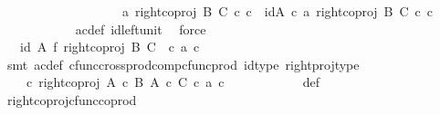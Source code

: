 \begin{isabellebody}
\ \ \ \ \ \ \isamarkupfalse%
\ {\isacharminus}{\kern0pt}\ \isanewline
\ \ \ \ \ \ \ \ \isamarkupfalse%
\ {\isachardoublequoteopen}{\isasymlangle}a{\isacharcomma}{\kern0pt}\ right{\isacharunderscore}{\kern0pt}coproj\ B\ C\ {\isasymcirc}\isactrlsub c\ c{\isasymrangle}\ {\isacharequal}{\kern0pt}\ {\isasymlangle}id{\isacharparenleft}{\kern0pt}A{\isacharparenright}{\kern0pt}\ {\isasymcirc}\isactrlsub c\ a{\isacharcomma}{\kern0pt}\ right{\isacharunderscore}{\kern0pt}coproj\ B\ C\ {\isasymcirc}\isactrlsub c\ c{\isasymrangle}{\isachardoublequoteclose}\isanewline
\ \ \ \ \ \ \ \ \ \ \isamarkupfalse%
\ ac{\isacharunderscore}{\kern0pt}def\ id{\isacharunderscore}{\kern0pt}left{\isacharunderscore}{\kern0pt}unit{}\ \isamarkupfalse%
\ force\isanewline
\ \ \ \ \ \ \ \ \isamarkupfalse%
\ \isamarkupfalse%
\ {\isachardoublequoteopen}{\isachardot}{\kern0pt}{\isachardot}{\kern0pt}{\isachardot}{\kern0pt}\ {\isacharequal}{\kern0pt}\ {\isacharparenleft}{\kern0pt}id\ A\ {\isasymtimes}\isactrlsub f\ right{\isacharunderscore}{\kern0pt}coproj\ B\ C{\isacharparenright}{\kern0pt}\ \ {\isasymcirc}\isactrlsub c\ {\isasymlangle}a{\isacharcomma}{\kern0pt}\ c{\isasymrangle}{\isachardoublequoteclose}\isanewline
\ \ \ \ \ \ \ \ \ \ \isamarkupfalse%
\ {\isacharparenleft}{\kern0pt}smt\ ac{\isacharunderscore}{\kern0pt}def\ cfunc{\isacharunderscore}{\kern0pt}cross{\isacharunderscore}{\kern0pt}prod{\isacharunderscore}{\kern0pt}comp{\isacharunderscore}{\kern0pt}cfunc{\isacharunderscore}{\kern0pt}prod\ id{\isacharunderscore}{\kern0pt}type\ right{\isacharunderscore}{\kern0pt}proj{\isacharunderscore}{\kern0pt}type{\isacharparenright}{\kern0pt}\isanewline
\ \ \ \ \ \ \ \ \isamarkupfalse%
\ \isamarkupfalse%
\ {\isachardoublequoteopen}{\isachardot}{\kern0pt}{\isachardot}{\kern0pt}{\isachardot}{\kern0pt}\ {\isacharequal}{\kern0pt}\ {\isacharparenleft}{\kern0pt}{\isasymphi}\ {\isasymcirc}\isactrlsub c\ right{\isacharunderscore}{\kern0pt}coproj\ {\isacharparenleft}{\kern0pt}A\ {\isasymtimes}\isactrlsub c\ B{\isacharparenright}{\kern0pt}\ {\isacharparenleft}{\kern0pt}A\ {\isasymtimes}\isactrlsub c\ C{\isacharparenright}{\kern0pt}{\isacharparenright}{\kern0pt}\ {\isasymcirc}\isactrlsub c\ {\isasymlangle}a{\isacharcomma}{\kern0pt}\ c{\isasymrangle}{\isachardoublequoteclose}\isanewline
\ \ \ \ \ \ \ \ \ \ \isamarkupfalse%
\ {\isasymphi}{\isacharunderscore}{\kern0pt}def\ \isamarkupfalse%
\ right{\isacharunderscore}{\kern0pt}coproj{\isacharunderscore}{\kern0pt}cfunc{\isacharunderscore}{\kern0pt}coprod\ \isamarkupfalse%

\end{isabellebody}

